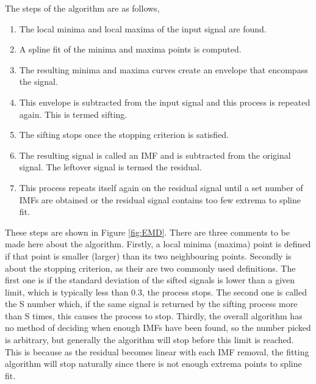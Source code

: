     The steps of the algorithm are as follows,
    \begin{enumerate}
        \item The local minima and local maxima of the input signal are found.
        \item A spline fit of the minima and maxima points is computed.
        \item The resulting minima and maxima curves create an envelope that encompass the signal.
        \item This envelope is subtracted from the input signal and this process is repeated again. This is termed sifting.
        \item The sifting stops once the stopping criterion is satisfied.
        \item The resulting signal is called an IMF and is subtracted from the original signal. The leftover signal is termed the residual.
        \item This process repeats itself again on the residual signal until a set number of IMFs are obtained or the residual signal contains too few extrema to spline fit.
    \end{enumerate}
    These steps are shown in Figure \ref{fig:EMD}.
    There are three comments to be made here about the algorithm.
    Firstly, a local minima (maxima) point is defined if that point is smaller (larger) than its two neighbouring points.
    Secondly is about the stopping criterion, as their are two commonly used definitions.
    The first one is if the standard deviation of the sifted signals is lower than a given limit, which is typically less than 0.3, the process stops.
    The second one is called the S number which, if the same signal is returned by the sifting process more than S times, this causes the process to stop.
    Thirdly, the overall algorithm has no method of deciding when enough IMFs have been found, so the number picked is arbitrary, but generally the algorithm will stop before this limit is reached.
    This is because as the residual becomes linear with each IMF removal, the fitting algorithm will stop naturally since there is not enough extrema points to spline fit.

